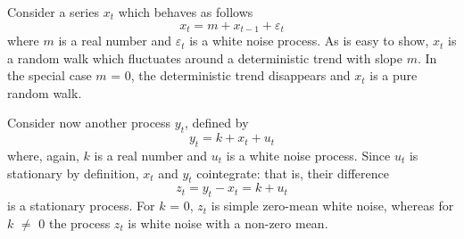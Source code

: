 Consider a series $x_t$ which behaves as follows
%      
\[ x_t = m + x_{t-1} + \varepsilon_t \] 
%
where $m$ is a real number and $\varepsilon_t$ is a white noise
process. As is easy to show, $x_t$ is a random walk which fluctuates
around a deterministic trend with slope $m$. In the special case $m$ =
0, the deterministic trend disappears and $x_t$ is a pure random walk.
    
Consider now another process $y_t$, defined by
%      
\[ y_t = k + x_t + u_t \] 
%
where, again, $k$ is a real number and $u_t$ is a white noise process.
Since $u_t$ is stationary by definition, $x_t$ and $y_t$ cointegrate:
that is, their difference
%      
\[ z_t = y_t - x_t = k + u_t \]
%	
is a stationary process. For $k$ = 0, $z_t$ is simple zero-mean white
noise, whereas for $k$ $\ne$ 0 the process $z_t$ is white noise with a
non-zero mean.
  

